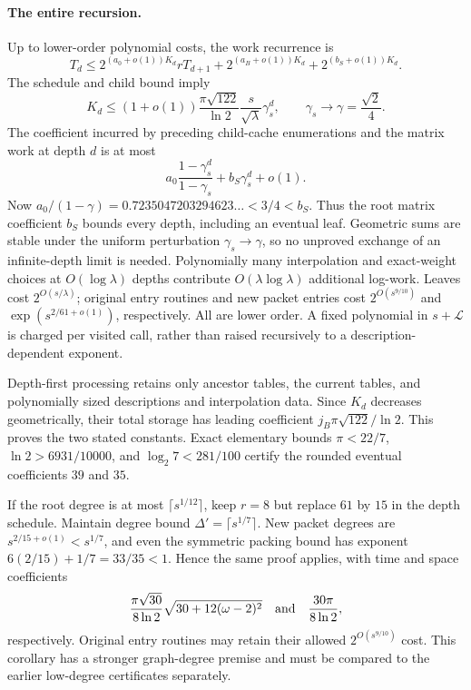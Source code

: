 \paragraph{The entire recursion.}
Up to lower-order polynomial costs, the work recurrence is
\[
 T_d\le2^{(a_0+o(1))K_d}rT_{d+1}
          +2^{(a_B+o(1))K_d}+2^{(b_S+o(1))K_d}.
\]
The schedule and child bound imply
\[
 K_d\le(1+o(1))\frac{\pi\sqrt{122}}{\ln2}
       \frac{s}{\sqrt\lambda}\gamma_s^d,
 \qquad \gamma_s\longrightarrow\gamma=\frac{\sqrt2}{4}.
\]
The coefficient incurred by preceding child-cache enumerations and the
matrix work at depth $d$ is at most
\[
 a_0\frac{1-\gamma_s^d}{1-\gamma_s}+b_S\gamma_s^d+o(1).
\]
Now $a_0/(1-\gamma)=0.7235047203294623\ldots<3/4<b_S$.
Thus the root matrix coefficient $b_S$ bounds every depth, including
an eventual leaf.  Geometric sums are stable under the uniform perturbation
$\gamma_s\to\gamma$, so no unproved exchange of an infinite-depth limit
is needed.  Polynomially many interpolation and exact-weight choices at
$O(\log\lambda)$ depths contribute $O(\lambda\log\lambda)$ additional
log-work.  Leaves cost $2^{O(s/\lambda)}$; original entry routines and
new packet entries cost $2^{O(s^{9/10})}$ and
$\exp(s^{2/61+o(1)})$, respectively.  All are lower order.
A fixed polynomial in $s+\mathcal L$ is charged per visited call, rather
than raised recursively to a description-dependent exponent.

Depth-first processing retains only ancestor tables, the current tables,
and polynomially sized descriptions and interpolation data.  Since $K_d$
decreases geometrically, their total storage has leading coefficient
$j_B\pi\sqrt{122}/\ln2$.  This proves the two stated constants.
Exact elementary bounds $\pi<22/7$, $\ln2>6931/10000$, and
$\log_2 7<281/100$ certify the rounded eventual coefficients $39$ and $35$.

\begin{corollary}
\label{cor:cached-lowdegree}
If the root degree is at most $\lceil s^{1/12}\rceil$, keep $r=8$ but
replace $61$ by $15$ in the depth schedule.  Maintain degree bound
$\Delta'=\lceil s^{1/7}\rceil$.  New packet degrees are
$s^{2/15+o(1)}<s^{1/7}$, and even the symmetric packing bound has exponent
$6(2/15)+1/7=33/35<1$.  Hence the same proof applies, with time and
space coefficients
\[
 \frac{\pi\sqrt{30}}{8\ln2}\sqrt{30+12(\omega-2)^2}
 \quad\hbox{and}\quad
 \frac{30\pi}{8\ln2},
\]
respectively.  Original entry routines may retain their allowed
$2^{O(s^{9/10})}$ cost.  This corollary has a stronger graph-degree premise
and must be compared to the earlier low-degree certificates separately.
\end{corollary}

